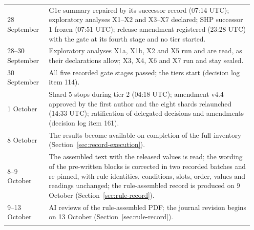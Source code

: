 \begin{table}[htbp]
\begin{tabular}{@{}p{}p{}@{}}
28 September & G1c summary repaired by its successor record (07:14 UTC); exploratory analyses X1--X2 and X3--X7 declared; SHP successor 1 frozen (07:51 UTC); release amendment registered (23:28 UTC) with the gate at its fourth stage and no tier started. \\
28--30 September & Exploratory analyses X1a, X1b, X2 and X5 run and are read, as their declarations allow; X3, X4, X6 and X7 run and stay sealed. \\
30 September & All five recorded gate stages passed; the tiers start (decision log item 114). \\
1 October & Shard 5 stops during tier 2 (04:18 UTC); amendment v4.4 approved by the first author and the eight shards relaunched (14:33 UTC); ratification of delegated decisions and amendments (decision log item 161). \\
8 October & The results become available on completion of the full inventory (Section~\ref{sec:record-execution}). \\
8--9 October & The assembled text with the released values is read; the wording of the pre-written blocks is corrected in two recorded batches and re-pinned, with rule identities, conditions, slots, order, values and readings unchanged; the rule-assembled record is produced on 9 October (Section~\ref{sec:rule-record}). \\
9--13 October & AI reviews of the rule-assembled PDF; the journal revision begins on 13 October (Section~\ref{sec:rule-record}). \\
\botrule
\end{tabular}
\end{table}


